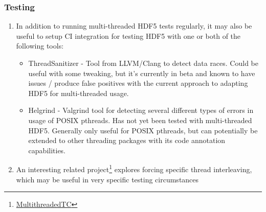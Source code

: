 \documentclass[../HDF5_RFC.tex]{subfiles}
\begin{document}
\subsubsection{Testing}

\begin{enumerate}

    \item In addition to running multi-threaded HDF5 tests regularly, it may also be useful to setup CI
          integration for testing HDF5 with one or both of the following tools:

          \begin{itemize}

              \item ThreadSanitizer - Tool from LLVM/Clang to detect data races. Could be useful with
                    some tweaking, but it's currently in beta and known to have issues / produce false
                    positives with the current approach to adapting HDF5 for multi-threaded usage.

              \item Helgrind - Valgrind tool for detecting several different types of errors in usage
                    of POSIX pthreads. Has not yet been tested with multi-threaded HDF5. Generally only
                    useful for POSIX pthreads, but can potentially be extended to other threading packages
                    with its code annotation capabilities.

          \end{itemize}

    \item An interesting related project\footnote{\href{http://www.cs.umd.edu/projects/PL/multithreadedtc/overview.html}{MultithreadedTC}} explores forcing specific thread interleaving, which may be useful in very specific testing circumstances

\end{enumerate}
\end{document}

